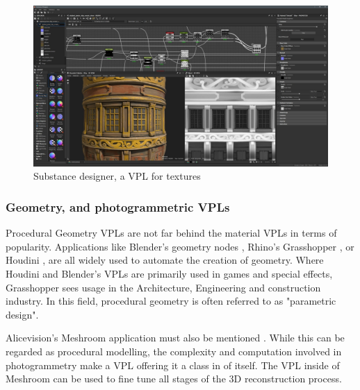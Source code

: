 \begin{figure}
  \centering
  \graphicspath{{../../assets/images/3/}}
  \includegraphics[width=\linewidth]{substance-designer.jpg}
  \caption[Geometry VPL]{Substance designer, a VPL for textures \citep{rutten_grasshopper_2012}}
  \label{fig:texture-vpl}
\end{figure}

\subsubsection*{Geometry, and photogrammetric VPLs}

Procedural Geometry \ac{VPL}s are not far behind the material \ac{VPL}s in terms of popularity.
Applications like Blender's geometry nodes \citep{blender_foundation_geometry_2022}, Rhino's Grasshopper \citep{rutten_grasshopper_2012}, or Houdini \citep{sidefx_houdini_2022}, are all widely used to automate the creation of geometry. 
Where Houdini and Blender's VPLs are primarily used in games and special effects, Grasshopper sees usage in the Architecture, Engineering and construction industry. 
In this field, procedural geometry is often referred to as "parametric design".

Alicevision's Meshroom application must also be mentioned \citep{alicevision_meshroom_2022}.
While this can be regarded as procedural modelling, the complexity and computation involved in photogrammetry make a VPL offering it a class in of itself. 
The VPL inside of Meshroom can be used to fine tune all stages of the 3D reconstruction process.

